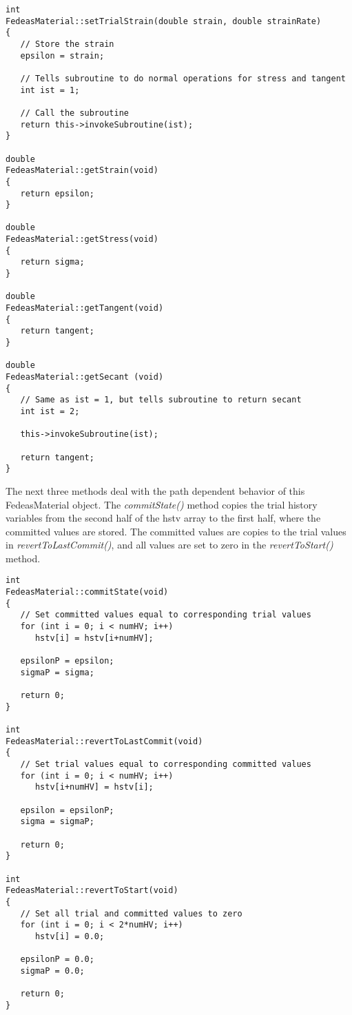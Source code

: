 \documentclass[12pt]{article}
\begin{document}
{\sf\small
\begin{verbatim}
int
FedeasMaterial::setTrialStrain(double strain, double strainRate)
{
   // Store the strain
   epsilon = strain;

   // Tells subroutine to do normal operations for stress and tangent
   int ist = 1;

   // Call the subroutine
   return this->invokeSubroutine(ist);
}

double
FedeasMaterial::getStrain(void)
{
   return epsilon;
}

double
FedeasMaterial::getStress(void)
{
   return sigma;
}

double
FedeasMaterial::getTangent(void)
{
   return tangent;
}

double
FedeasMaterial::getSecant (void)
{
   // Same as ist = 1, but tells subroutine to return secant
   int ist = 2;

   this->invokeSubroutine(ist);

   return tangent;
}
\end{verbatim}
}

\noindent The next three methods deal with the path dependent behavior of this FedeasMaterial object.
The {\em commitState()} method copies the trial history variables from the second half of the
hstv array to the first half, where the committed values are stored. The committed values are
copies to the trial values in {\em revertToLastCommit()}, and all values are set to zero in the
{\em revertToStart()} method.

{\sf\small
\begin{verbatim}
int
FedeasMaterial::commitState(void)
{
   // Set committed values equal to corresponding trial values
   for (int i = 0; i < numHV; i++)
      hstv[i] = hstv[i+numHV];

   epsilonP = epsilon;
   sigmaP = sigma;

   return 0;
}

int
FedeasMaterial::revertToLastCommit(void)
{
   // Set trial values equal to corresponding committed values
   for (int i = 0; i < numHV; i++)
      hstv[i+numHV] = hstv[i];

   epsilon = epsilonP;
   sigma = sigmaP;

   return 0;
}

int
FedeasMaterial::revertToStart(void)
{
   // Set all trial and committed values to zero
   for (int i = 0; i < 2*numHV; i++)
      hstv[i] = 0.0;

   epsilonP = 0.0;
   sigmaP = 0.0;

   return 0;
}
\end{verbatim}
}
\end{document}
